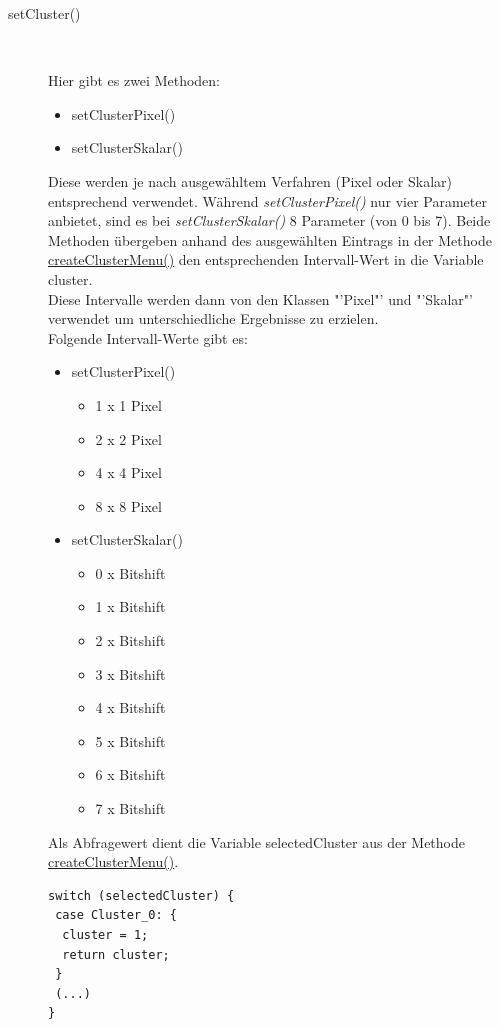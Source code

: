 \begin{description}
\item[setCluster()]~\par
\label{setCluster}
Hier gibt es zwei Methoden:
\begin{itemize}
\item setClusterPixel()
\item setClusterSkalar()
\end{itemize}
Diese werden je nach ausgewähltem Verfahren (Pixel oder Skalar) entsprechend verwendet. Während \textit{setClusterPixel()} nur vier Parameter anbietet, sind es bei \textit{setClusterSkalar()} 8 Parameter (von 0 bis 7).
Beide Methoden übergeben anhand des ausgewählten Eintrags in der Methode \hyperref[createClusterMenu]{createClusterMenu()} den entsprechenden Intervall-Wert in die Variable \textcolor{lila}{cluster}.\\
Diese Intervalle werden dann von den Klassen "'Pixel"' und "'Skalar"' verwendet um unterschiedliche Ergebnisse zu erzielen.\\
Folgende Intervall-Werte gibt es:
\begin{itemize}
\item setClusterPixel()
\begin{itemize}
\item 1 x 1 Pixel
\item 2 x 2 Pixel
\item 4 x 4 Pixel
\item 8 x 8 Pixel
\end{itemize}
\item setClusterSkalar()
\begin{itemize}
\item 0 x Bitshift
\item 1 x Bitshift
\item 2 x Bitshift
\item 3 x Bitshift
\item 4 x Bitshift
\item 5 x Bitshift
\item 6 x Bitshift
\item 7 x Bitshift
\end{itemize}
\end{itemize}
Als Abfragewert dient die Variable \textcolor{lila}{selectedCluster} aus der Methode \hyperref[createClusterMenu]{createClusterMenu()}.
\begin{lstlisting}
switch (selectedCluster) {
 case Cluster_0: {
  cluster = 1;
  return cluster;
 }
 (...)
} 
\end{lstlisting}


\end{description}
